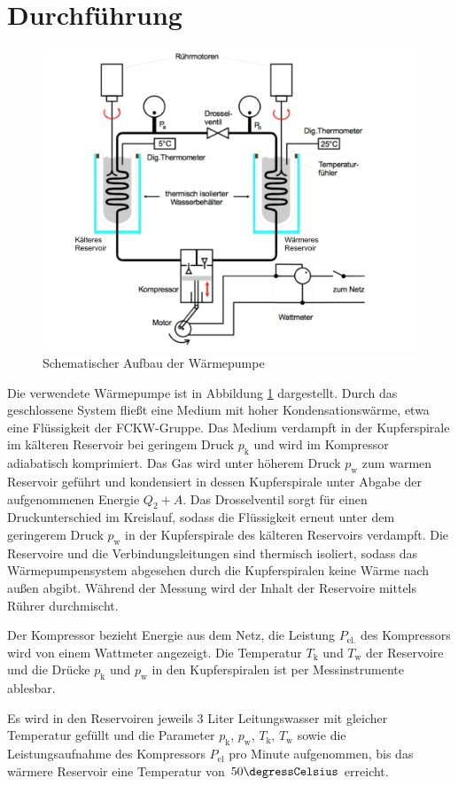 \section{Durchführung}
\label{sec:Durchfuehrung}
\begin{figure}
	\includegraphics[width=\textwidth]{Bilder/Abbildung.pdf}
	\caption{Schematischer Aufbau der Wärmepumpe \cite{V206}}
	\label{fig:pumpe}
\end{figure}
Die verwendete Wärmepumpe ist in Abbildung \ref{fig:pumpe} dargestellt.
Durch das geschlossene System fließt eine Medium mit hoher Kondensationswärme, etwa eine Flüssigkeit der FCKW-Gruppe.
Das Medium verdampft in der Kupferspirale im kälteren Reservoir bei geringem Druck $p_\text{k}$ und wird im Kompressor adiabatisch komprimiert. 
Das Gas wird unter höherem Druck $p_\text{w}$ zum warmen Reservoir geführt und kondensiert in dessen Kupferspirale unter Abgabe der aufgenommenen Energie $Q_2+A$.
Das Drosselventil sorgt für einen Druckunterschied im Kreislauf, sodass die Flüssigkeit erneut unter dem geringerem Druck $p_\text{w}$ in der Kupferspirale des kälteren Reservoirs verdampft. 
Die Reservoire und die Verbindungsleitungen sind thermisch isoliert, sodass das Wärmepumpensystem abgesehen durch die Kupferspiralen keine Wärme nach außen abgibt.
Während der Messung wird der Inhalt der Reservoire mittels Rührer durchmischt.

Der Kompressor bezieht Energie aus dem Netz, die Leistung $P_\text{el.}$ des Kompressors wird von einem Wattmeter angezeigt. 
Die Temperatur $T_\text{k}$ und $T_\text{w}$ der Reservoire und die Drücke $p_\text{k}$ und $p_\text{w}$ in den Kupferspiralen ist per Messinstrumente ablesbar.

Es wird in den Reservoiren jeweils 3 Liter Leitungswasser mit gleicher Temperatur gefüllt und die Parameter $p_\text{k}$, $p_\text{w}$, $T_\text{k}$, $T_\text{w}$ sowie die Leistungsaufnahme des Kompressors $P_\text{el}$ pro Minute aufgenommen, bis das wärmere Reservoir eine Temperatur von $50\si{\degressCelsius}$ erreicht.